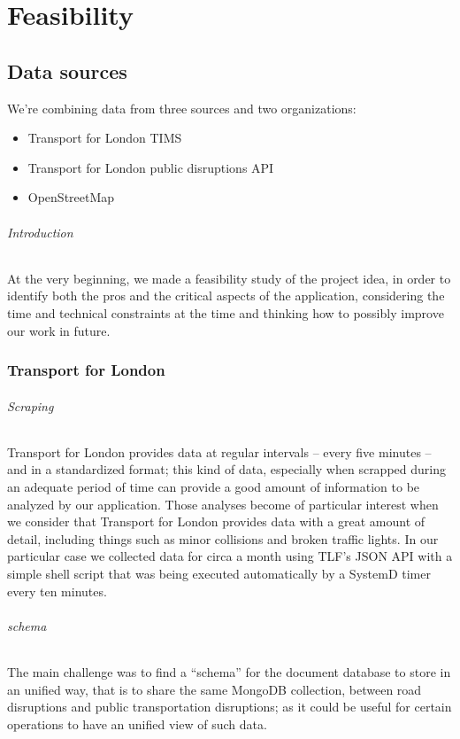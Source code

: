 
\part{Feasibility}
\chapter{Data sources}

We’re combining data from three sources and two organizations:

\begin{itemize}
	\item Transport for London TIMS
	\item Transport for London public disruptions API
	\item OpenStreetMap
\end{itemize}

\paragraph{Introduction}
At the very beginning, we made a feasibility study of the project idea, in 
order to identify both the pros and the critical aspects of the application, 
considering the time and technical constraints at the time and thinking how to 
possibly improve our work in future.

\section{Transport for London}

\paragraph{Scraping}
Transport for London provides data at regular intervals – every five 
minutes –  and in a standardized format; this kind of data, especially when 
scrapped during an adequate period of time can provide a good amount of 
information to be analyzed by our application. Those analyses become of 
particular interest when we consider that Transport for London provides 
data with a great amount of detail, including things such as minor collisions 
and broken traffic lights. In our particular case we collected data for circa a 
month using TLF’s JSON API with a simple shell script that was being executed 
automatically by a SystemD timer every ten minutes.

\paragraph{schema}
The main challenge was to find a “schema” for the document database to store in 
an unified way, that is to share the same MongoDB collection, between road 
disruptions and public transportation disruptions; as it could be useful for 
certain operations to have an unified view of such data.

